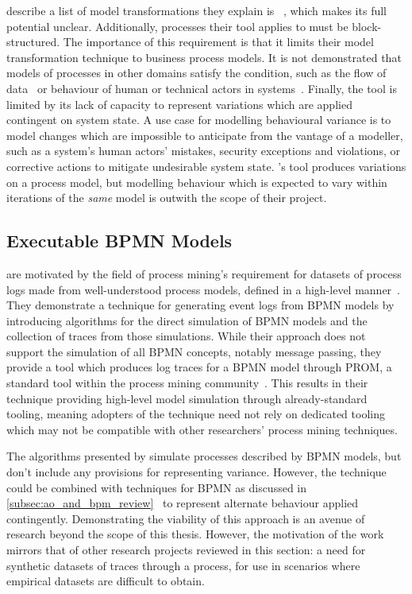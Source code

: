 \citeauthor{pourmasoumi2015business} describe a list of model transformations
they explain is ~\cite{pourmasoumi2015business}, which makes its full potential
unclear. Additionally, processes their tool applies to must be block-structured.
The importance of this requirement is that it limits their model transformation
technique to business process models. It is not demonstrated that models of
processes in other domains satisfy the condition, such as the flow of
data~\cite{obashimethodology} or behaviour of human or technical actors in
\sociotechnical systems~\cite{wallis2018caise}. Finally, the tool is limited by
its lack of capacity to represent variations which are applied contingent on
system state. A use case for modelling behavioural variance is to model changes
which are impossible to anticipate from the vantage of a modeller, such as a
\sociotechnical system's human actors' mistakes, security exceptions and
violations, or corrective actions to mitigate undesirable system state.
\citeauthor{pourmasoumi2015business}'s tool produces variations on a process
model, but modelling behaviour which is expected to vary within iterations of
the \emph{same} model is outwith the scope of their project.



\subsection{Executable BPMN Models}

\citeauthor{ExecutableBPMNMitsyuk} are motivated by the field of process
mining's requirement for datasets of process logs made from well-understood
process models, defined in a high-level manner~\cite{ExecutableBPMNMitsyuk}.
They demonstrate a technique for generating event logs from BPMN models by
introducing algorithms for the direct simulation of BPMN models and the
collection of traces from those simulations. While their approach does not
support the simulation of all BPMN concepts, notably message passing, they
provide a tool which produces log traces for a BPMN model through PROM, a
standard tool within the process mining community~\cite{van2005prom}. This
results in their technique providing high-level model simulation through
already-standard tooling, meaning adopters of the technique need not rely on
dedicated tooling which may not be compatible with other researchers' process
mining techniques.

The algorithms presented by \citeauthor{ExecutableBPMNMitsyuk} simulate
processes described by BPMN models, but don't include any provisions for
representing variance. However, the technique could be combined with
\aspectorientation{} techniques for BPMN as discussed in
\cref{subsec:ao_and_bpm_review}~\cite{charfi2010AO4BPMN,Cappelli_AOBPM} to represent
alternate behaviour applied contingently. Demonstrating the viability of this
approach is an avenue of research beyond the scope of this thesis. However, the
motivation of the work mirrors that of other research projects reviewed in this
section: a need for synthetic datasets of traces through a process, for use in
scenarios where empirical datasets are difficult to obtain.



